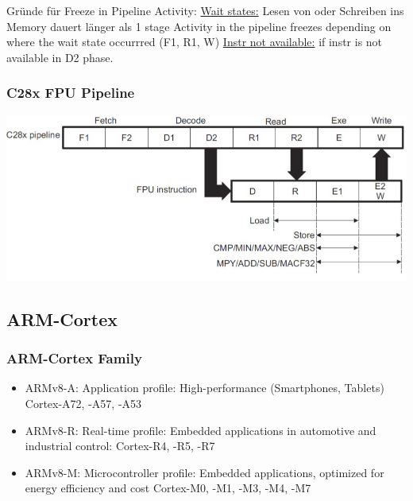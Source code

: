 \begin{minipage}{0.25\textwidth}
Gründe für Freeze in Pipeline Activity: \newline
\underline{Wait states:} Lesen von oder Schreiben ins Memory dauert länger als 1 stage \newline
Activity in the pipeline freezes depending on where the wait state occurrred (F1, R1, W)\newline
\underline{Instr not available:} if instr is not available in D2 phase.
\end{minipage}
\newpage
\begin{minipage}{0.45\textwidth}
	\subsubsection{C28x FPU Pipeline}
	\includegraphics[width = 1\linewidth]{images/Plattformen/C28xPipeline}
\end{minipage}
\begin{minipage}{0.55\textwidth}
\subsection{ARM-Cortex}
\subsubsection{ARM-Cortex Family}
\begin{itemize}
 \item ARMv8-A: Application profile: High-performance (Smartphones, Tablets) Cortex-A72, -A57, -A53
 \item ARMv8-R: Real-time profile: Embedded applications in automotive and industrial control: Cortex-R4, -R5, -R7
 \item ARMv8-M: Microcontroller profile: Embedded applications, optimized for energy efficiency and cost Cortex-M0, -M1, -M3, -M4, -M7
\end{itemize}
\end{minipage}
